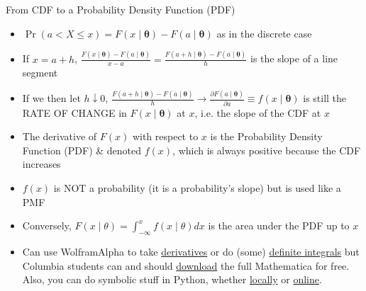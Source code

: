\documentclass[
  ignorenonframetext,
]{beamer}
\providecommand{\tightlist}{%
  \setlength{\itemsep}{0pt}\setlength{\parskip}{0pt}}
\begin{document}
\begin{frame}{From CDF to a Probability Density Function (PDF)}
\protect\hypertarget{from-cdf-to-a-probability-density-function-pdf}{}
\begin{itemize}[<+->]
\tightlist
\item
  \(\Pr\left(a<X\leq x\right)=F\left(x \mid \boldsymbol{\theta}\right)-F\left(a \mid \boldsymbol{\theta}\right)\)
  as in the discrete case
\item
  If \(x=a+h\),
  \(\frac{F\left(x \mid \boldsymbol{\theta}\right)-F\left(a \mid \boldsymbol{\theta}\right)}{x-a}=\frac{F\left(a+h \mid \boldsymbol{\theta}\right)-F\left(a \mid \boldsymbol{\theta}\right)}{h}\)
  is the slope of a line segment
\item
  If we then let \(h\downarrow0\),
  \(\frac{F\left(a+h \mid \boldsymbol{\theta}\right)-F\left(a \mid \boldsymbol{\theta}\right)}{h}\rightarrow\frac{\partial F\left(a \mid \boldsymbol{\theta}\right)}{\partial a}\equiv f\left(x \mid \boldsymbol{\theta}\right)\)
  is still the RATE OF CHANGE in
  \(F\left(x \mid \boldsymbol{\theta}\right)\) at \(x\), i.e. the slope
  of the CDF at \(x\)
\item
  The derivative of \(F\left(x\right)\) with respect to \(x\) is the
  Probability Density Function (PDF) \& denoted \(f\left(x\right)\),
  which is always positive because the CDF increases
\item
  \(f\left(x\right)\) is NOT a probability (it is a probability's slope)
  but is used like a PMF
\item
  Conversely,
  \(F\left(x\mid\theta\right) = \int_{-\infty}^x f\left(x \mid \theta\right)dx\)
  is the area under the PDF up to \(x\)
\item
  Can use WolframAlpha to take
  \href{https://www.wolframalpha.com/input/?i=partial+derivative}{derivatives}
  or do (some)
  \href{https://www.wolframalpha.com/input/?i=definite+integral}{definite
  integrals} but Columbia students can and should
  \href{https://cuit.columbia.edu/content/mathematica}{download} the
  full Mathematica for free. Also, you can do symbolic stuff in Python,
  whether \href{https://www.sympy.org/en/index.html}{locally} or
  \href{https://www.sympygamma.com/}{online}.
\end{itemize}
\end{frame}
\end{document}

